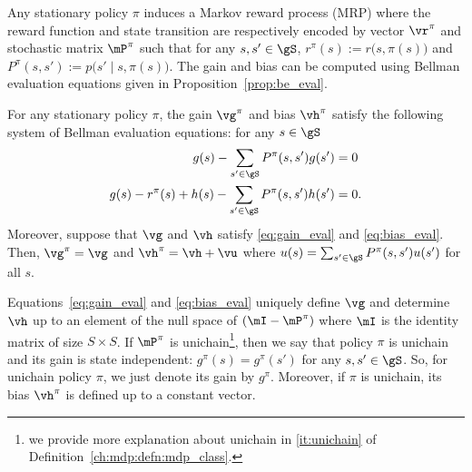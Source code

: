 Any stationary policy $\pi$ induces a Markov reward process (MRP) where the reward function and state transition are respectively encoded by vector $\vr^\pi$ and stochastic matrix $\mP^\pi$ such that for any $s,s'\in\gS$, $r^\pi(s):=r\big(s,\pi(s)\big)$ and $P^\pi(s,s'):=p\big(s'\mid s,\pi(s)\big)$.
The gain and bias can be computed using Bellman evaluation equations given in Proposition~\ref{prop:be_eval}.
\begin{prop}
    \label{prop:be_eval}
    For any stationary policy $\pi$, the gain $\vg^\pi$ and bias $\vh^\pi$ satisfy the following system of Bellman evaluation equations: for any $s\in\gS$
    \begin{align}
        g(s) -\sum_{s'\in\gS}P^\pi(s,s')g(s') &=0 \label{eq:gain_eval}\\
        g(s) -r^\pi(s) +h(s) -\sum_{s'\in\gS}P^\pi(s,s')h(s') &=0. \label{eq:bias_eval}
    \end{align}
    Moreover, suppose that $\vg$ and $\vh$ satisfy \eqref{eq:gain_eval} and \eqref{eq:bias_eval}. Then, $\vg^\pi=\vg$ and $\vh^\pi=\vh+\vu$ where $u(s)=\sum_{s'\in\gS}P^\pi(s,s')u(s')$ for all $s$.
\end{prop}
Equations~\eqref{eq:gain_eval} and \eqref{eq:bias_eval} uniquely define $\vg$ and determine $\vh$ up to an element of the null space of $(\mI-\mP^\pi)$ where $\mI$ is the identity matrix of size $S\times S$.
If $\mP^\pi$ is unichain\footnote{we provide more explanation about unichain in \ref{it:unichain} of Definition~\ref{ch:mdp:defn:mdp_class}.}, then we say that policy $\pi$ is unichain and its gain is state independent: $g^\pi(s)=g^\pi(s')$ for any $s,s'\in\gS$.
So, for unichain policy $\pi$, we just denote its gain by $g^\pi$.
Moreover, if $\pi$ is unichain, its bias $\vh^\pi$ is defined up to a constant vector.

